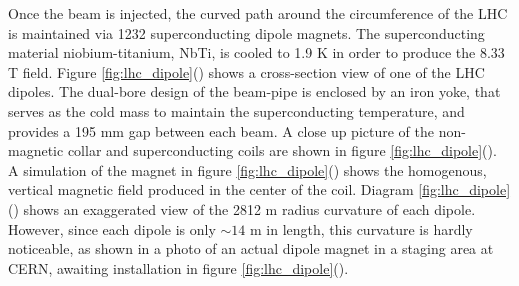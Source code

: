 \par Once the beam is injected, the curved path around the
circumference of the LHC is maintained via 1232 superconducting dipole
magnets.  The superconducting material niobium-titanium, NbTi, is
cooled to 1.9 K in order to produce the 8.33 T field.  Figure
\ref{fig:lhc_dipole}() shows a cross-section
view of one of the LHC dipoles.  The dual-bore design of the beam-pipe
is enclosed by an iron yoke, that serves as the cold mass to maintain
the superconducting temperature, and provides a 195 mm gap between
each beam.  A close up picture of the non-magnetic collar and
superconducting coils are shown in figure
\ref{fig:lhc_dipole}().  A
simulation  of the magnet in figure
\ref{fig:lhc_dipole}() shows the
homogenous, vertical magnetic field produced in the center of the
coil.  Diagram \ref{fig:lhc_dipole}()
shows an exaggerated view of the 2812 m radius curvature of each
dipole. However, since each dipole is only $\sim14$ m in length, this
curvature is hardly noticeable, as shown in a photo of an actual
dipole magnet in a staging area at CERN, awaiting installation in
figure \ref{fig:lhc_dipole}().   

